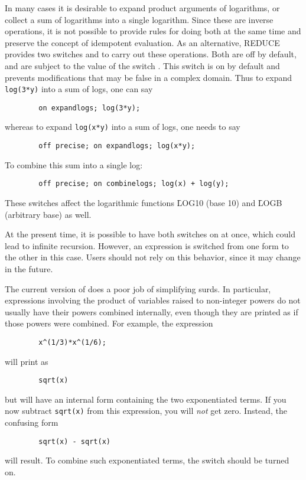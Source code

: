 \hypertarget{switch:COMBINELOGS}{}
\hypertarget{switch:EXPANDLOGS}{}
In many cases it is desirable to expand product arguments of logarithms,
or collect a sum of logarithms into a single logarithm.  Since these are
inverse operations, it is not possible to provide rules for doing both at
the same time and preserve the {\REDUCE} concept of idempotent evaluation.
As an alternative, REDUCE provides two switches
 and
 to carry
out these operations.  Both are off by default, and are subject
to the value of the switch . This switch is on
by default and prevents modifications that may be false in a complex domain.
Thus to expand \texttt{log(3*y)} into a sum of logs, one can say
\begin{verbatim}
        on expandlogs; log(3*y);
\end{verbatim}
whereas to expand \texttt{log(x*y)} into a sum of logs, one needs to say
\begin{verbatim}
        off precise; on expandlogs; log(x*y);
\end{verbatim}
To combine this sum into a single log:
\begin{verbatim}
        off precise; on combinelogs; log(x) + log(y);
\end{verbatim}

These switches affect the logarithmic functions \f{LOG10} (base 10) and \f{LOGB}
(arbitrary base) as well.

At the present time, it is possible to have both switches on at once,
which could lead to infinite recursion.  However, an expression is
switched from one form to the other in this case.  Users should not rely
on this behavior, since it may change in the future.

\hypertarget{switch:COMBINEEXPT}{}
The current version of {\REDUCE} does a poor job of simplifying surds.  In
particular, expressions involving the product of variables raised to
non-integer powers do not usually have their powers combined internally,
even though they are printed as if those powers were combined.  For
example, the expression
\begin{verbatim}
        x^(1/3)*x^(1/6);
\end{verbatim}
will print as
\begin{verbatim}
        sqrt(x)
\end{verbatim}
but will have an internal form containing the two exponentiated terms.
If you now subtract \texttt{sqrt(x)} from this expression, you will
\emph{not} get zero.  Instead, the confusing form
\begin{verbatim}
        sqrt(x) - sqrt(x)
\end{verbatim}
will result.  To combine such exponentiated terms, the switch
 should be turned on.

